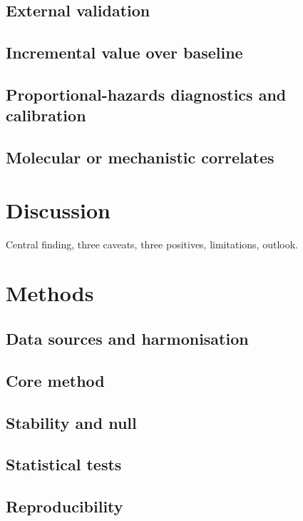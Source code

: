 \documentclass[11pt,a4paper]{article}
\begin{document}
\subsection{External validation}
\subsection{Incremental value over baseline}
\subsection{Proportional-hazards diagnostics and calibration}
\subsection{Molecular or mechanistic correlates}

\section{Discussion}\label{sec:discussion}
Central finding, three caveats, three positives, limitations, outlook.

\section{Methods}\label{sec:methods}

\subsection{Data sources and harmonisation}
\subsection{Core method}
\subsection{Stability and null}
\subsection{Statistical tests}
\subsection{Reproducibility}

\end{document}
